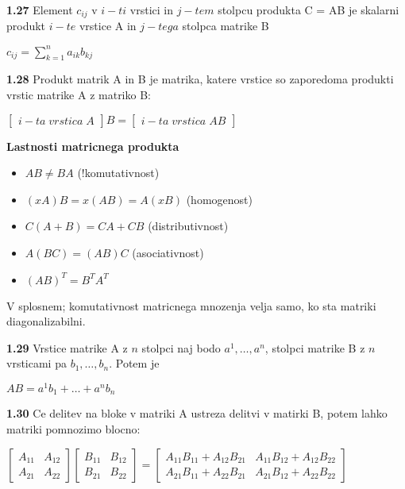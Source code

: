 \documentclass{article}
\begin{document}
\begin{multicols}{4}
	\textbf{1.27} Element $c_{ij}$ v $i-ti$ vrstici in $j-tem$ stolpcu
	produkta C = AB je skalarni produkt $i-te$ vrstice A in $j-tega$
	stolpca matrike B
	\begin{center}
		$c_{ij} =
			\sum_{k=1}^{n} a_{ik}b_{kj}
		$
	\end{center}

	\textbf{1.28} Produkt matrik A in B je matrika, katere vrstice
	so zaporedoma produkti vrstic matrike A z matriko B:
	\begin{center}
		$
			\begin{bmatrix}
				i-ta\; vrstica\; A
			\end{bmatrix}B =
			\begin{bmatrix}
				i-ta\; vrstica\; AB
			\end{bmatrix}
		$
	\end{center}

	\textbf{Lastnosti matricnega produkta}
	\begin{itemize}
		\item $AB \neq BA$ (!komutativnost)
		\item $(xA)B = x(AB) = A(xB)$ (homogenost)
		\item $C(A + B) = CA + CB$ (distributivnost)
		\item $A(BC) = (AB)C$ (asociativnost)
		\item $(AB)^{T} = B^{T}A^{T}$
	\end{itemize}
	V splosnem; komutativnost matricnega mnozenja velja
	samo, ko sta matriki diagonalizabilni.

	\textbf{1.29} Vrstice matrike A z $n$ stolpci naj bodo
	$a^{1}, \dots, a^{n}$, stolpci matrike B z $n$ vrsticami pa
	$b_{1}, \dots, b_{n}$. Potem je
	\begin{center}
		$AB = a^{1}b_{1} + \dots + a^{n}b_{n}$
	\end{center}

	\textbf{1.30} Ce delitev na bloke v matriki A ustreza delitvi v matirki B,
	potem lahko matriki pomnozimo blocno:
	\begin{center}
		$\begin{bmatrix}
				A_{11} & A_{12} \\
				A_{21} & A_{22}
			\end{bmatrix}
			\begin{bmatrix}
				B_{11} & B_{12} \\
				B_{21} & B_{22}
			\end{bmatrix} =
			\begin{bmatrix}
				A_{11}B_{11} + A_{12}B_{21} & A_{11}B_{12} + A_{12}B_{22} \\
				A_{21}B_{11} + A_{22}B_{21} & A_{21}B_{12} + A_{22}B_{22}
			\end{bmatrix}$
	\end{center}


\end{multicols}
\end{document}
